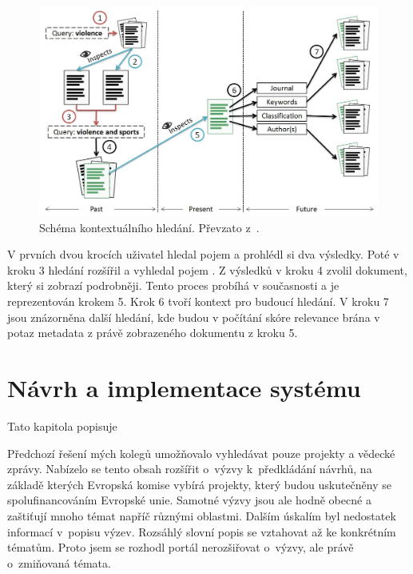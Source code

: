 

\begin{figure}[H]
	\centering
	\includegraphics[width=\textwidth]{obrazky-figures/contextual.png}
	\caption{Schéma kontextuálního hledání. Převzato z~\cite{bib:similarity-context}.}
	\label{img:contextual}
\end{figure}

V prvních dvou krocích uživatel hledal pojem  a prohlédl si dva výsledky. Poté v kroku 3 hledání rozšířil a vyhledal pojem . Z výsledků v kroku 4 zvolil dokument, který si zobrazí podrobněji. Tento proces probíhá v současnosti a je reprezentován krokem 5. Krok 6 tvoří kontext pro budoucí hledání. V kroku 7 jsou znázorněna další hledání, kde budou v počítání skóre relevance brána v potaz metadata z právě zobrazeného dokumentu z kroku 5.





\chapter{Návrh a implementace systému}
Tato kapitola popisuje \blindtext

Předchozí řešení mých kolegů umožňovalo vyhledávat pouze projekty a vědecké zprávy. Nabízelo se tento obsah rozšířit o~výzvy k~předkládání návrhů, na základě kterých Evropská komise vybírá projekty, který budou uskutečněny se spolufinancováním Evropské unie.
Samotné výzvy jsou ale hodně obecné a zaštiťují mnoho témat napříč různými oblastmi. Dalším úskalím byl nedostatek informací v~popisu výzev. Rozsáhlý slovní popis se vztahovat až ke konkrétním tématům. Proto jsem se rozhodl portál nerozšiřovat o~výzvy, ale právě o~zmiňovaná témata.

